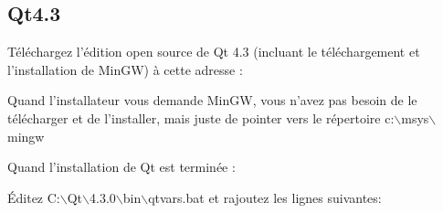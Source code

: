 %
%
%
%

\subsection{Qt4.3}
Téléchargez l'édition open source de Qt 4.3 (incluant le téléchargement et 
l'installation de MinGW) à cette adresse : 


Quand l'installateur vous demande MinGW, vous n'avez pas besoin de le
télécharger et de l'installer, mais juste de pointer vers le répertoire
c:$\backslash$msys$\backslash$mingw

Quand l'installation de Qt est terminée :

Éditez C:$\backslash$Qt$\backslash$4.3.0$\backslash$bin$\backslash$qtvars.bat et
rajoutez les lignes suivantes:

%
%

